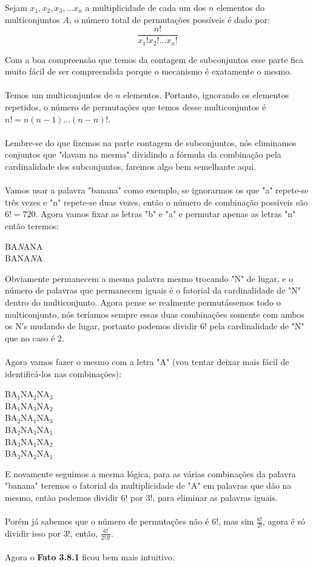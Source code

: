 \documentclass[main.tex]{subfiles}
\begin{document}
\begin{fact}
Sejam $x_{1}, x_{2}, x_{3},... x_{n}$ a multiplicidade de cada um dos $n$ elementos do multiconjuntos $A$, o número total de permutações possíveis é dado por:
$$\frac{n!}{x_{1}!x_{2}!...x_{n}!}$$
\end{fact}
Com a boa compreensão que temos da contagem de subconjuntos esse parte fica muito fácil de ser compreendida porque o mecanismo é exatamente o mesmo.
\\~\\
Temos um multiconjuntos de $n$ elementos. Portanto, ignorando os elementos repetidos, o número de permutações que temos desse multiconjuntos é $n! = n(n-1)...(n-n)!$.
\\~\\
Lembre-se do que fizemos na parte contagem de subconjuntos, nós eliminamos conjuntos que "davam na mesma" dividindo a fórmula da combinação pela cardinalidade dos subconjuntos, faremos algo bem semelhante aqui.
\\~\\
Vamos usar a palavra "banana" como exemplo, se ignorarmos os que "a" repete-se três vezes e "n" repete-se duas vezes, então o número de combinação possíveis são $6! = 720$. Agora vamos fixar as letras "b" e "a" e permutar apenas as letras "n" então teremos:
\begin{center}
BA\textit{N}ANA\\
BANA\textit{N}A
\end{center}
Obviamente permanecem a mesma palavra mesmo trocando "N" de lugar, e o número de palavras que permanecem iguais é o fatorial da cardinalidade de "N" dentro do multiconjunto. Agora pense se realmente permutássemos todo o multiconjunto, nós teríamos sempre essas duas combinações somente com ambos os N's mudando de lugar, portanto podemos dividir $6!$ pela cardinalidade de "N" que no caso é $2$.
\\~\\
Agora vamos fazer o mesmo com a letra "A" (vou tentar deixar mais fácil de identificá-los nas combinações):
\begin{center}
BA$_{1}$NA$_{2}$NA$_{3}$ \\
BA$_{1}$NA$_{3}$NA$_{2}$ \\
BA$_{2}$NA$_{1}$NA$_{3}$ \\
BA$_{2}$NA$_{3}$NA$_{1}$ \\
BA$_{3}$NA$_{1}$NA$_{2}$ \\
BA$_{3}$NA$_{2}$NA$_{1}$ \\
\end{center}
E novamente seguimos a mesma lógica, para as várias combinações da palavra "banana" teremos o fatorial da multiplicidade de "A" em palavras que dão na mesmo, então podemos dividir $6!$ por $3!$, para eliminar as palavras iguais.
\\~\\
Porém já sabemos que o número de permutações não é $6!$, mas sim $\frac{6!}{2!}$, agora é só dividir isso por $3!$, então, $\frac{6!}{2!3!}$.
\\~\\
Agora o \textbf{Fato 3.8.1} ficou bem mais intuitivo.
\end{document}
